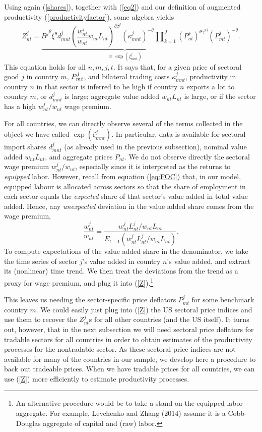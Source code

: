 \documentclass[12pt]{article}
\begin{document}
Using again (\ref{shares}), together with (\ref{eq2}) and our definition of
augmented productivity (\ref{productivityfactor}), some algebra yields 
\begin{equation}
Z_{nt}^{j} = \underbrace{{B^{j}}^{\theta }{\xi }^{\theta }d_{mnt}^{j}
\left(
\frac{w_{nt}^{j}}{w_{nt}}
w_{nt}L_{nt}\right)^{\theta \beta ^{j}}
\left( \kappa _{mnt}^{j}\right)^{-\theta }
\prod\nolimits_{k=1}^{J}(P_{nt}^{k})^{\theta\gamma ^{kj}}
}_{\equiv \exp (\zeta
_{mnt}^{j})}
\left( {P_{mt}^{j}}\right) ^{-\theta }.  \label{Z}
\end{equation}
This equation holds for all $n,m,j,t$. It
says that, for a given price of sectoral good $j$ in country $m$, ${%
P_{mt}^{j}}$, and bilateral trading costs $\kappa _{mnt}^{j}$, productivity
in country $n$ in that sector is inferred to be high if country $n$ exports
a lot to country $m$, or $d_{mnt}^{j}$ is large; aggregate value added $w_{nt}L_{nt}$ is large, 
or if the sector has a high $w_{nt}^{j}/w_{nt}$ wage premium.

For all countries, we can directly observe several of the terms collected in
the object we have called $\exp (\zeta _{mnt}^{j})$. In particular, data is
available for sectoral import shares $d_{mnt}^{j}$ (as already used in the
previous subsection), nominal value added $w_{nt}L_{nt}$, and aggregate
prices $P_{nt}$. We do not observe directly the sectoral wage premium $w
_{nt}^{j}/w_{nt}$, especially since it is interpreted as the returns to \emph{equipped} labor. 
However, recall from equation (\ref{eq:FOC}) that, in our model,
equipped labour is allocated across sectors so that the share of employment
in each sector equals the \textit{expected} share of that sector's value
added in total value added. Hence, any \emph{unexpected} deviation in the value added share comes from the wage premium,
\[
\frac {w_{nt}^j} {w_{nt}}
= \frac { w_{nt}^jL_{nt}^j/ w_{nt}L_{nt} }
	{ E_{t-1}(w_{nt}^jL_{nt}^j/ w_{nt}L_{nt}) }.
\]
To compute expectations of the value added share in the denominator, we
take the time series of sector $j$'s value added in country $n$'s value
added, and extract its (nonlinear) time trend. We then treat the deviations from the trend as a
proxy for wage premium, 
 and plug it into (\ref{Z}).\footnote{%
An alternative procedure would be to take a stand on the equipped-labor
aggregate. For example, Levchenko and Zhang (2014) assume it is a
Cobb-Douglas aggregate of capital and (raw) labor.}

This leaves us needing the sector-specific price deflators ${P_{mt}^{j}}$
for some benchmark country $m$. We could easily just plug into (\ref{Z}) the
US sectoral price indices and use them to recover the $Z_{nt}^{j}$s for all
other countries (and the US itself). It turns out, however, that in the next
subsection we will need sectoral price deflators for tradable sectors for
all countries in order to obtain estimates of the productivity processes for
the nontradable sector. As these sectoral price indices are not available
for many of the countries in our sample, we develop here a procedure to back
out tradeable prices. When we have tradable prices for all countries, we can
use (\ref{Z}) more efficiently to estimate productivity processes.
\end{document}
